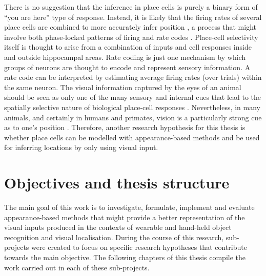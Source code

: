 There is no suggestion that the inference in place cells is purely a binary form of ``you are here'' type of response.  Instead, it is likely that the firing rates of several place cells are combined to more accurately infer position \cite{hafting2005microstructure}, a process that might involve both phase-locked patterns of firing and rate codes \cite{dragoi2006temporal}. Place-cell selectivity itself is thought to arise from a combination of inputs and cell responses inside and outside hippocampal areas. Rate coding \cite{van2001rate} is just one mechanism by which groups of neurons are thought to encode and represent sensory information. A rate code can be interpreted by estimating average firing rates (over trials) within the same neuron. 
The visual information captured by the eyes of an animal should be seen as only one of the many sensory and internal cues that lead to the spatially selective nature of biological place-cell responses \cite{hassabis2009decoding}. Nevertheless, in many animals, and certainly in humans and primates, vision is a particularly strong cue as to one's position \cite{epstein1998cortical}. Therefore, another research hypothesis for this thesis is whether place cells can be modelled with appearance-based methods and be used for inferring locations by only using visual input.


\section{Objectives and thesis structure}

The main goal of this work is to investigate, formulate, implement and evaluate appearance-based methods that might provide a better representation of the visual inputs produced in the contexts of wearable and hand-held object recognition and visual localisation. During the course of this research, sub-projects were created to focus on specific research hypotheses that contribute towards the main objective. The following chapters of this thesis compile the work carried out in each of these sub-projects.


